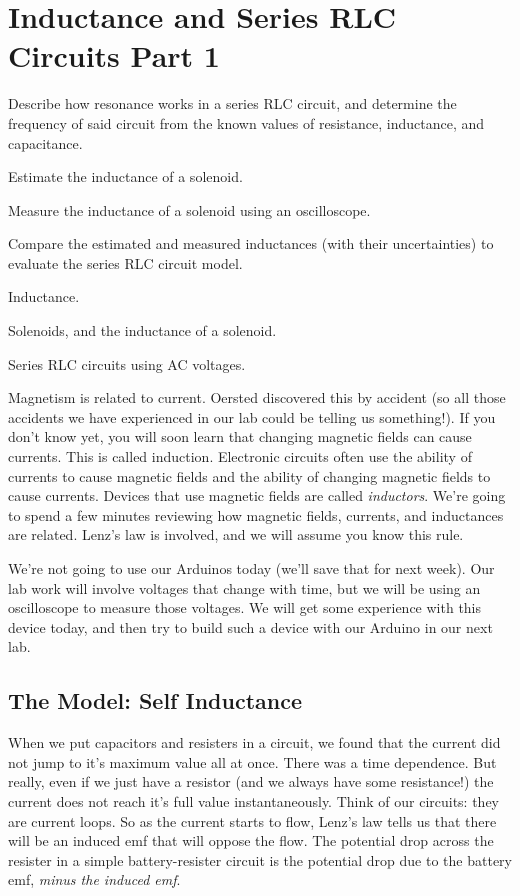 \chapter{Inductance and Series RLC Circuits Part 1}

\objectives
{
\item Describe how resonance works in a series RLC circuit, and determine
	the frequency of said circuit from the known values of resistance,
	inductance, and capacitance.
\item Estimate the inductance of a solenoid.
\item Measure the inductance of a solenoid using an oscilloscope.
\item Compare the estimated and measured inductances (with their uncertainties)
	to evaluate the series RLC circuit model.
}
\review
{
\item Inductance.
\item Solenoids, and the inductance of a solenoid.
\item Series RLC circuits using AC voltages.
}

Magnetism is
related to current. Oersted discovered this by accident (so all those
accidents we have experienced in our lab could be telling us something!). If
you don't know yet, you will soon learn that changing magnetic fields can
cause currents. This is called induction. Electronic circuits often use the
ability of currents to cause magnetic fields and the ability of changing
magnetic fields to cause currents. Devices that use magnetic fields are
called \emph{inductors}. We're going to spend a few minutes reviewing how
magnetic fields, currents, and inductances are related. Lenz's law is
involved, and we will assume you know this rule.

We're not going to use our Arduinos today (we'll save that for next week). 
Our lab work will involve voltages that change with time, but we will be 
using an oscilloscope to measure those voltages. We
will get some experience with this device today, and then try to build such
a device with our Arduino in our next lab.

\section{The Model: Self Inductance}

When we put capacitors and resisters in a circuit, we found that the current
did not jump to it's maximum value all at once. There was a time dependence.
But really, even if we just have a resistor (and we always have some
resistance!) the current does not reach it's full value instantaneously.
Think of our circuits: they are current loops. So as the current starts to
flow, Lenz's law tells us that there will be an induced emf that will oppose
the flow. The potential drop across the resister in a simple
battery-resister circuit is the potential drop due to the battery emf, \emph{%
minus the induced emf}.

